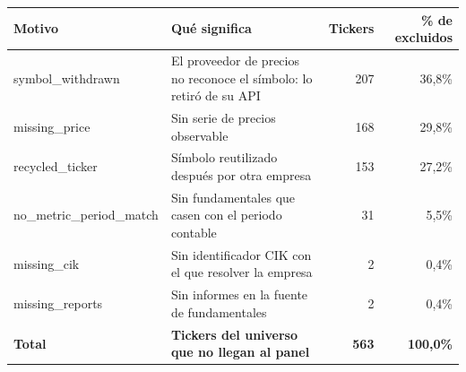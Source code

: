 \begin{tabular}{l p{6.8cm} rr}
\toprule
Motivo & Qué significa & Tickers & \% de excluidos \\
\midrule
symbol\_withdrawn & El proveedor de precios no reconoce el símbolo: lo retiró de su API & 207 & 36,8\% \\
missing\_price & Sin serie de precios observable & 168 & 29,8\% \\
recycled\_ticker & Símbolo reutilizado después por otra empresa & 153 & 27,2\% \\
no\_metric\_period\_match & Sin fundamentales que casen con el periodo contable & 31 & 5,5\% \\
missing\_cik & Sin identificador CIK con el que resolver la empresa & 2 & 0,4\% \\
missing\_reports & Sin informes en la fuente de fundamentales & 2 & 0,4\% \\
\textbf{Total} & \textbf{Tickers del universo que no llegan al panel} & \textbf{563} & \textbf{100,0\%} \\
\bottomrule
\end{tabular}
